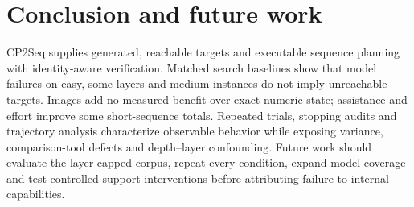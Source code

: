 \section{Conclusion and future work}
\label{sec:conclusion}
CP2Seq supplies generated, reachable targets and executable sequence planning with
identity-aware verification. Matched search baselines show that model failures on
easy, some-layers and medium instances do not imply unreachable targets. Images add
no measured benefit over exact numeric state; assistance and effort improve some
short-sequence totals. Repeated trials, stopping audits and trajectory analysis
characterize observable behavior while exposing variance, comparison-tool defects
and depth--layer confounding. Future work should evaluate the layer-capped corpus,
repeat every condition, expand model coverage and test controlled support
interventions before attributing failure to internal capabilities.
\label{sec:main-text-end}
